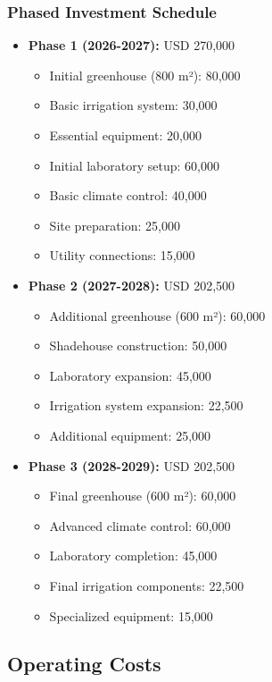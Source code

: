 \subsubsection{Phased Investment Schedule}
\begin{itemize}
    \item \textbf{Phase 1 (2026-2027):} USD 270,000
    \begin{itemize}
        \item Initial greenhouse (800 m²): 80,000
        \item Basic irrigation system: 30,000
        \item Essential equipment: 20,000
        \item Initial laboratory setup: 60,000
        \item Basic climate control: 40,000
        \item Site preparation: 25,000
        \item Utility connections: 15,000
    \end{itemize}
    
    \item \textbf{Phase 2 (2027-2028):} USD 202,500
    \begin{itemize}
        \item Additional greenhouse (600 m²): 60,000
        \item Shadehouse construction: 50,000
        \item Laboratory expansion: 45,000
        \item Irrigation system expansion: 22,500
        \item Additional equipment: 25,000
    \end{itemize}
    
    \item \textbf{Phase 3 (2028-2029):} USD 202,500
    \begin{itemize}
        \item Final greenhouse (600 m²): 60,000
        \item Advanced climate control: 60,000
        \item Laboratory completion: 45,000
        \item Final irrigation components: 22,500
        \item Specialized equipment: 15,000
    \end{itemize}
\end{itemize}

\subsection{Operating Costs}

